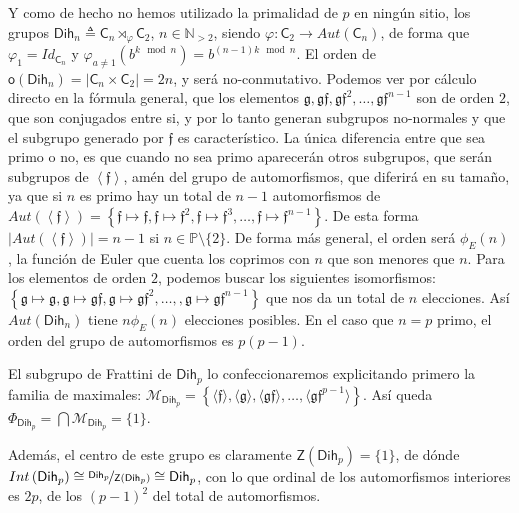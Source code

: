 \documentclass[12pt,a4paper,fleqn,spanish,final,openright]{extbook}
\theoremstyle{definition}
\theoremstyle{remark}
\begin{document}
Y como de hecho no hemos utilizado la primalidad de $p$ en ningún sitio, los grupos $\mathsf{Dih}_{n} \triangleq \mathsf{C}_{n}\rtimes_{\varphi }\mathsf{C}_{2}$, $n \in \mathds{N}_{{}>2}$, siendo $\varphi : \mathsf{C}_{2}  \longrightarrow  Aut(\mathsf{C}_{n})$, de forma que $\varphi_1 = Id_{\mathsf{C}_{n}}$ y $\varphi_{a \neq  1}(b^{k \mod n}) = b^{(n-1)k \mod n}$. El orden de $\mathsf{o}(\mathsf{Dih}_{n})=\left|\mathsf{C}_{n} \times  \mathsf{C}_{2}\right|=2n$, y será no-conmutativo.
Podemos ver por cálculo directo en la fórmula general, que los elementos $\mathfrak{g},\mathfrak{gf},\mathfrak{gf}^2, \ldots , \mathfrak{gf}^{n-1}$ son de orden $2$, que son conjugados entre si, y por lo tanto generan subgrupos no-normales y que el subgrupo generado por $\mathfrak{f}$ es característico. La única diferencia entre que sea primo o no, es que cuando no sea primo aparecerán otros subgrupos, que serán subgrupos de $\left\langle\mathfrak{f}\right\rangle$, amén del grupo de automorfismos, que diferirá en su tamaño, ya que si $n$ es primo hay un total de $n-1$ automorfismos de $Aut(\left\langle\mathfrak{f}\right\rangle) = \left\lbrace{\mathfrak{f}\mapsto \mathfrak{f},\mathfrak{f}\mapsto \mathfrak{f}^2,\mathfrak{f}\mapsto \mathfrak{f}^3,\ldots ,\mathfrak{f}\mapsto \mathfrak{f}^{n-1} }\right\rbrace$. De esta forma $\left|Aut(\left\langle\mathfrak{f}\right\rangle)\right|=n-1$ si $n\in\mathds{P}\setminus\{2\}$. De forma más general, el orden será $\phi_{E}(n)$, la función de Euler que cuenta los coprimos con $n$ que son menores que $n$.
Para los elementos de orden $2$, podemos buscar los siguientes isomorfismos: $\left\{{\mathfrak{g}\mapsto\mathfrak{g},\mathfrak{g}\mapsto\mathfrak{g}\mathfrak{f},\mathfrak{g}\mapsto\mathfrak{g}\mathfrak{f}^2,\ldots,,\mathfrak{g}\mapsto\mathfrak{g}\mathfrak{f}^{n-1}}\right\}$ que nos da un total de $n$ elecciones. Así $Aut(\mathsf{Dih}_{n})$ tiene $n\phi_{E}(n)$ elecciones posibles. En el caso que $n=p$ primo, el orden del grupo de automorfismos es $p(p-1)$.

El subgrupo de Frattini de ${\mathsf{Dih}}_{p}$ lo confeccionaremos explicitando primero la familia de maximales:
${\mathcal{M}}_{{\mathsf{Dih}}_{p}} = \left\{ { \langle \mathfrak{f} \rangle,\langle \mathfrak{g} \rangle,\langle
\mathfrak{gf}\rangle,\ldots,\langle \mathfrak{gf}^{p-1}\rangle } \right\} $. Así queda $\Phi_{{\mathsf{Dih}}_{p}} =
\bigcap\mathcal{M}_{{\mathsf{Dih}}_{p}} = \{1\}$.

Además, el centro de este grupo es claramente $\mathsf{Z}\left({{\mathsf{Dih}}_{p}}\right)=\{1\}$, de dónde $Int\left({{\mathsf{Dih}}_{p}}\right)\cong\nicefrac{{{\mathsf{Dih}}_{p}}}{\mathsf{Z}({{\mathsf{Dih}}_{p}})}\cong{{\mathsf{Dih}}_{p}}$, con lo que ordinal de los automorfismos interiores es $2p$, de los $(p-1)^2$ del total de automorfismos.
\end{document}
